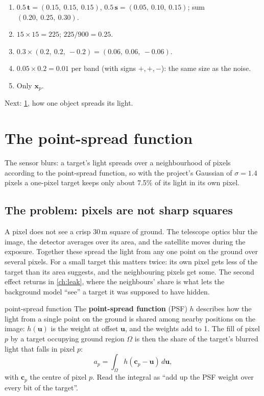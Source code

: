 \documentclass[11pt,a4paper,oneside,openany]{book}
\newcommand{\B}[1]{{\symbf{#1}}}
\newcommand{\B}[1]{{\bm{#1}}}
\newcommand{\vx}{\B{x}}
\newcommand{\vt}{\B{t}}
\newcommand{\vs}{\B{s}}
\newcommand{\nextchapter}[1]{\par\medskip\noindent\hfill\textsf{\small Next: #1}\par}
\begin{document}
\begin{answers}
\begin{enumerate}
\item $0.5\,\vt=(0.15,\ 0.15,\ 0.15)$, $0.5\,\vs=(0.05,\ 0.10,\ 0.15)$; sum $(0.20,\ 0.25,\ 0.30)$.
\item $15\times15=225$; $225/900=0.25$.
\item $0.3\times(0.2,\ 0.2,\ -0.2)=(0.06,\ 0.06,\ -0.06)$.
\item $0.05\times0.2=0.01$ per band (with signs $+,+,-$): the same size as the noise.
\item Only $\vx_p$.
\end{enumerate}
\end{answers}

\nextchapter{\cref{ch:psf}, how one object spreads its light.}

\chapter{The point-spread function}
\label{ch:psf}

\begin{onething}
The sensor blurs: a target's light spreads over a neighbourhood of pixels according to the point-spread function, so with the
project's Gaussian of $\sigma=1.4$ pixels a one-pixel target keeps only about 7.5\% of its light in its own pixel.
\end{onething}

\section{The problem: pixels are not sharp squares}

A pixel does not see a crisp 30\,m square of ground. The telescope optics blur the image, the detector averages over its area, and
the satellite moves during the exposure. Together these spread the light from any one point on the ground over several pixels.
For a small target this matters twice: its own pixel gets less of the target than its area suggests, and the neighbouring pixels
get some. The second effect returns in \cref{ch:leak}, where the neighbours' share is what lets the background model ``see'' a
target it was supposed to have hidden.

\begin{defn}{point-spread function}
The \textbf{point-spread function} (PSF) $h$ describes how the light from a single point on the ground is shared among nearby
positions on the image: $h(\B u)$ is the weight at offset $\B u$, and the weights add to 1. The fill of pixel $p$ by a target
occupying ground region $\Omega$ is then the share of the target's blurred light that falls in pixel $p$:
\[
  a_p=\int_\Omega h(\B c_p-\B u)\,d\B u,
\]
with $\B c_p$ the centre of pixel $p$. Read the integral as ``add up the PSF weight over every bit of the target''.
\end{defn}
\end{document}
